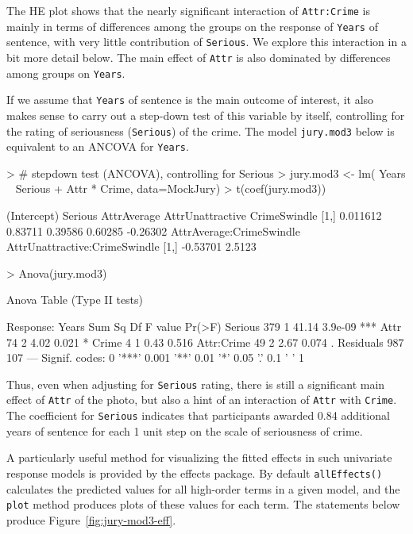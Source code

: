 \documentclass[11pt]{article}
\newcommand{\figref}[1]{Figure~\ref{#1}}
\newcommand{\pkg}[1]{{\textsf{#1} package}}
\newcommand{\code}[1]{{\texttt{#1}}}
\newcommand{\func}[1]{{\texttt{#1()}}}
\begin{document}
The HE plot shows that the nearly significant
interaction of \code{Attr:Crime} is mainly in terms of
differences among the groups on the response of \code{Years} of sentence,
with very little contribution of \code{Serious}.  We explore this interaction in a bit more detail
below.  The main effect of \code{Attr} is also dominated by differences among groups
on \code{Years}. 

If we assume that \code{Years} of sentence is the main outcome of interest,
it also makes sense to carry out a step-down test of this variable by itself,
controlling for the rating of seriousness (\code{Serious}) of the crime.
The model \code{jury.mod3} below is equivalent to an ANCOVA for \code{Years}.
\begin{Schunk}
\begin{Sinput}
> # stepdown test (ANCOVA), controlling for Serious
> jury.mod3 <- lm( Years ~ Serious + Attr * Crime, data=MockJury)
> t(coef(jury.mod3))
\end{Sinput}
\begin{Soutput}
     (Intercept) Serious AttrAverage AttrUnattractive CrimeSwindle
[1,]    0.011612 0.83711     0.39586          0.60285     -0.26302
     AttrAverage:CrimeSwindle AttrUnattractive:CrimeSwindle
[1,]                 -0.53701                        2.5123
\end{Soutput}
\begin{Sinput}
> Anova(jury.mod3)
\end{Sinput}
\begin{Soutput}
Anova Table (Type II tests)

Response: Years
           Sum Sq  Df F value  Pr(>F)    
Serious       379   1   41.14 3.9e-09 ***
Attr           74   2    4.02   0.021 *  
Crime           4   1    0.43   0.516    
Attr:Crime     49   2    2.67   0.074 .  
Residuals     987 107                    
---
Signif. codes:  0 '***' 0.001 '**' 0.01 '*' 0.05 '.' 0.1 ' ' 1 
\end{Soutput}
\end{Schunk}
Thus, even when adjusting for \code{Serious} rating, there is still a 
significant main effect of \code{Attr} of the photo, but also a hint of
an interaction of \code{Attr} with \code{Crime}. The coefficient for
\code{Serious} indicates that participants awarded 0.84 additional
years of sentence for each 1 unit step on the scale of seriousness of crime.

A particularly useful
method for visualizing the fitted effects in such univariate response
models is provided by the \pkg{effects}.  By default \func{allEffects}
calculates the predicted values for all high-order terms in a given
model, and the \code{plot} method produces plots of these values for
each term.  The statements below produce \figref{fig:jury-mod3-eff}.
\end{document}
